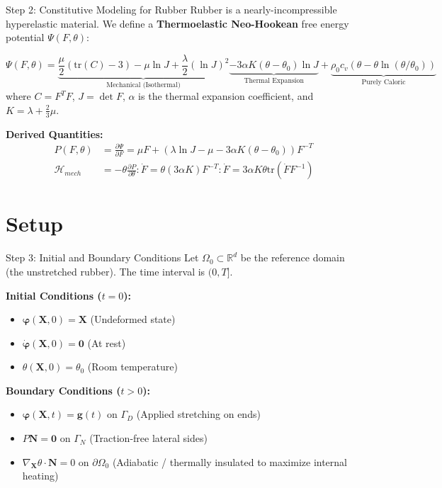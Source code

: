 \documentclass[aspectratio=169]{beamer}
\begin{document}
\begin{frame}{Step 2: Constitutive Modeling for Rubber}
    Rubber is a nearly-incompressible hyperelastic material. We define a \textbf{Thermoelastic Neo-Hookean} free energy potential $\Psi(F, \theta)$:
    
    $$ \Psi(F, \theta) = \underbrace{\frac{\mu}{2}(\text{tr}(C) - 3) - \mu \ln J + \frac{\lambda}{2}(\ln J)^2}_{\text{Mechanical (Isothermal)}} \underbrace{- 3\alpha K (\theta - \theta_0) \ln J}_{\text{Thermal Expansion}} + \underbrace{\rho_0 c_v (\theta - \theta \ln(\theta/\theta_0))}_{\text{Purely Caloric}} $$
    where $C = F^T F$, $J = \det F$, $\alpha$ is the thermal expansion coefficient, and $K = \lambda + \frac{2}{3}\mu$.
    
    \textbf{Derived Quantities:}
    \begin{align*}
        P(F, \theta) &= \frac{\partial \Psi}{\partial F} = \mu F + (\lambda \ln J - \mu - 3\alpha K (\theta - \theta_0)) F^{-T} \tag{First Piola Stress} \\
        \mathcal{H}_{mech} &= - \theta \frac{\partial P}{\partial \theta} : \dot{F} = \theta (3\alpha K) F^{-T} : \dot{F} = 3\alpha K \theta \text{tr}(\dot{F} F^{-1}) \tag{Coupling Term}
    \end{align*}
\end{frame}

\section{Setup}

\begin{frame}{Step 3: Initial and Boundary Conditions}
    Let $\Omega_0 \subset \mathbb{R}^d$ be the reference domain (the unstretched rubber). The time interval is $(0, T]$.
    
    \textbf{Initial Conditions ($t=0$):}
    \begin{itemize}
        \item $\bm{\varphi}(\bm{X}, 0) = \bm{X}$ (Undeformed state)
        \item $\dot{\bm{\varphi}}(\bm{X}, 0) = \bm{0}$ (At rest)
        \item $\theta(\bm{X}, 0) = \theta_0$ (Room temperature)
    \end{itemize}
    
    \textbf{Boundary Conditions ($t > 0$):}
    \begin{itemize}
        \item $\bm{\varphi}(\bm{X}, t) = \bm{g}(t)$ on $\Gamma_D$ (Applied stretching on ends)
        \item $P \bm{N} = \bm{0}$ on $\Gamma_N$ (Traction-free lateral sides)
        \item $\nabla_{\bm{X}} \theta \cdot \bm{N} = 0$ on $\partial \Omega_0$ (Adiabatic / thermally insulated to maximize internal heating)
    \end{itemize}
\end{frame}
\end{document}

